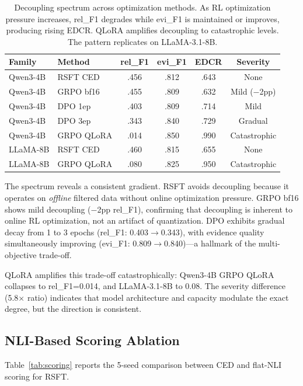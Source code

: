 \documentclass[11pt,a4paper]{article}
\begin{document}
\begin{table}[t]
\centering
\small
\begin{tabular}{llcccc}
\toprule
\textbf{Family} & \textbf{Method} & \textbf{rel\_F1} & \textbf{evi\_F1} & \textbf{EDCR} & \textbf{Severity} \\
\midrule
Qwen3-4B & RSFT CED & .456 & .812 & .643 & None \\
Qwen3-4B & GRPO bf16 & .455 & .809 & .632 & Mild ($-$2pp) \\
Qwen3-4B & DPO 1ep & .403 & .809 & .714 & Mild \\
Qwen3-4B & DPO 3ep & .343 & .840 & .729 & Gradual \\
Qwen3-4B & GRPO QLoRA & .014 & .850 & .990 & Catastrophic \\
\midrule
LLaMA-8B & RSFT CED & .460 & .815 & .655 & None \\
LLaMA-8B & GRPO QLoRA & .080 & .825 & .950 & Catastrophic \\
\bottomrule
\end{tabular}
\caption{Decoupling spectrum across optimization methods. As RL optimization pressure increases, rel\_F1 degrades while evi\_F1 is maintained or improves, producing rising EDCR. QLoRA amplifies decoupling to catastrophic levels. The pattern replicates on LLaMA-3.1-8B.}
\label{tab:spectrum}
\end{table}

The spectrum reveals a consistent gradient. RSFT avoids decoupling because it operates on \emph{offline} filtered data without online optimization pressure. GRPO bf16 shows mild decoupling ($-$2pp rel\_F1), confirming that decoupling is inherent to online RL optimization, not an artifact of quantization. DPO exhibits gradual decay from 1 to 3 epochs (rel\_F1: 0.403$\to$0.343), with evidence quality simultaneously improving (evi\_F1: 0.809$\to$0.840)---a hallmark of the multi-objective trade-off.

QLoRA amplifies this trade-off catastrophically: Qwen3-4B GRPO QLoRA collapses to rel\_F1=0.014, and LLaMA-3.1-8B to 0.08. The severity difference (5.8$\times$ ratio) indicates that model architecture and capacity modulate the exact degree, but the direction is consistent.

\subsection{NLI-Based Scoring Ablation}
\label{sec:scoring}

Table~\ref{tab:scoring} reports the 5-seed comparison between CED and flat-NLI scoring for RSFT.
\end{document}

